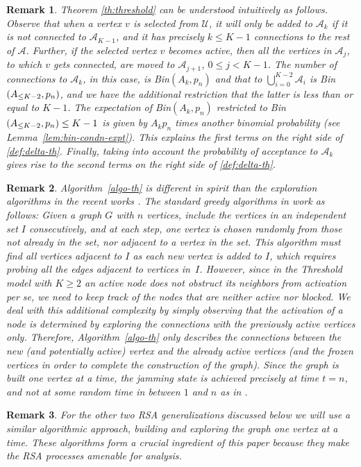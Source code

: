 \documentclass[11pt,a4paper, reqno]{article}
\newtheorem{remark}{Remark}
\begin{document}
\begin{remark}
\normalfont
Theorem \ref{th:threshold} can be understood intuitively as follows.
Observe that when a vertex $v$ is selected from $\mathcal{U}$, it will only be added to $\mathcal{A}_k$ if it is not connected to $\mathcal{A}_{K-1}$, and it has precisely $k\leq K-1$ connections to the rest of $\mathcal{A}$. Further, if the selected vertex $v$ becomes active, then all the vertices in $\mathcal{A}_j$, to which $v$ gets connected, are moved to $\mathcal{A}_{j+1}$, $0\leq j<K-1$. 
The number of connections to $\mathcal{A}_{k}$, in this case, is Bin$(A_{k},p_n)$ and that to $\bigcup_{i=0}^{K-2}\mathcal{A}_i$ is Bin$(A_{{\scriptscriptstyle}\leq K-2},p_n)$, and we have the additional restriction that the latter is less than or equal to $K-1$. The expectation of Bin$(A_{k},p_n)$ restricted to  Bin$(A_{{\scriptscriptstyle}\leq K-2},p_n)\leq K-1$ is given by $A_kp_n$ times another binomial probability (see Lemma~\ref{lem:bin-condn-expt}). This explains the first terms on the right side of \eqref{def:delta-th}.
Finally, taking into account the probability of acceptance to $\mathcal{A}_k$ gives rise to the second terms on the right side of \eqref{def:delta-th}. 
\end{remark}
\begin{remark}\normalfont Algorithm~\ref{algo-th} is different in spirit than the  exploration algorithms in the recent works \cite{SJK15,BJL15}.
The standard greedy algorithms in \cite{SJK15,BJL15} work as follows: Given a graph $G$ with $n$ vertices, include the vertices in an independent set $I$ consecutively, and at each step, one vertex is chosen randomly from those not already in
the set, nor adjacent to a vertex in the set. This algorithm must find all vertices adjacent to
$I$ as each new vertex is added to $I$, which requires probing
all the edges adjacent to vertices in~$I$.
However, since in the Threshold model with $K\geq 2$ an active node does not obstruct its neighbors from activation per se, we need to keep track of the nodes that are neither active nor blocked. We deal with this additional complexity by simply observing that the activation of a node is determined by exploring the connections with the previously active vertices only. Therefore, Algorithm~\ref{algo-th} only describes the connections between the new (and potentially active) vertex and the already active vertices (and the frozen vertices in order to complete the construction of the graph). Since the graph is built one vertex at a time, the jamming state is achieved precisely at time $t=n$, and not at some random time in between $1$ and $n$ as in  \cite{SJK15,BJL15}.
\end{remark}
\begin{remark}\normalfont
For the other two RSA generalizations discussed below we will use a similar algorithmic approach, building and exploring the graph  one vertex at a time. These algorithms form a crucial ingredient of this paper because they make the RSA processes amenable for analysis.
\end{remark}
\end{document}
